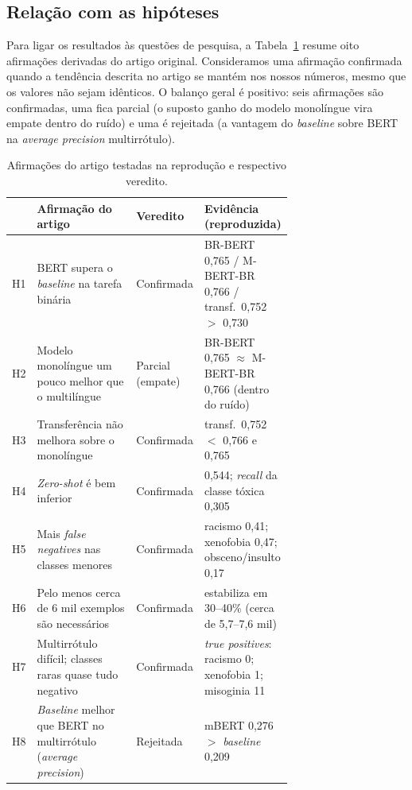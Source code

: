 \documentclass[sigconf, nonacm]{acmart}
\begin{document}
\subsection{Relação com as hipóteses}
\label{sec:res-hipoteses}
 
Para ligar os resultados às questões de pesquisa, a
Tabela~\ref{tab:hipoteses} resume oito afirmações derivadas do artigo
original. Consideramos uma afirmação confirmada quando a tendência descrita
no artigo se mantém nos nossos números, mesmo que os valores não sejam
idênticos. O balanço geral é positivo: seis afirmações são confirmadas, uma
fica parcial (o suposto ganho do modelo monolíngue vira empate dentro do
ruído) e uma é rejeitada (a vantagem do \emph{baseline} sobre BERT na
\emph{average precision} multirrótulo).
 
\begin{table}[t]
  \caption{Afirmações do artigo testadas na reprodução e respectivo veredito.}
  \label{tab:hipoteses}
  \small
  \begin{tabular}{@{}cp{0.40\linewidth}lp{0.30\linewidth}@{}}
    \toprule
     & \textbf{Afirmação do artigo} & \textbf{Veredito} & \textbf{Evidência (reproduzida)} \\
    \midrule
    H1 & BERT supera o \emph{baseline} na tarefa binária & Confirmada & BR-BERT 0,765 / M-BERT-BR 0,766 / transf.\ 0,752 $>$ 0,730 \\
    H2 & Modelo monolíngue um pouco melhor que o multilíngue & Parcial (empate) & BR-BERT 0,765 $\approx$ M-BERT-BR 0,766 (dentro do ruído) \\
    H3 & Transferência não melhora sobre o monolíngue & Confirmada & transf.\ 0,752 $<$ 0,766 e 0,765 \\
    H4 & \emph{Zero-shot} é bem inferior & Confirmada & 0,544; \emph{recall} da classe tóxica 0,305 \\
    H5 & Mais \emph{false negatives} nas classes menores & Confirmada & racismo 0,41; xenofobia 0,47; obsceno/insulto 0,17 \\
    H6 & Pelo menos cerca de 6 mil exemplos são necessários & Confirmada & estabiliza em 30--40\% (cerca de 5,7--7,6 mil) \\
    H7 & Multirrótulo difícil; classes raras quase tudo negativo & Confirmada & \emph{true positives}: racismo 0; xenofobia 1; misoginia 11 \\
    H8 & \emph{Baseline} melhor que BERT no multirrótulo (\emph{average precision}) & Rejeitada & mBERT 0,276 $>$ \emph{baseline} 0,209 \\
    \bottomrule
  \end{tabular}
\end{table}
 
\end{document}
